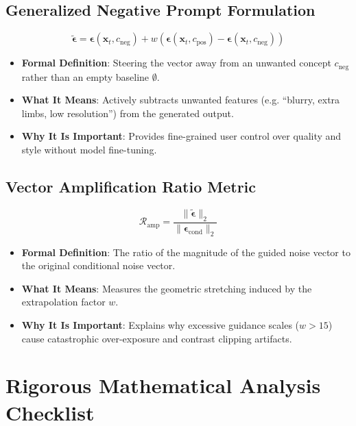 \documentclass[11pt,a4paper]{article}
\theoremstyle{definition}
\begin{document}
\subsection{Generalized Negative Prompt Formulation}
{\boldmath
\begin{equation}
\tilde{\boldsymbol{\epsilon}} = \boldsymbol{\epsilon}(\mathbf{x}_t, c_{\text{neg}}) + w \left( \boldsymbol{\epsilon}(\mathbf{x}_t, c_{\text{pos}}) - \boldsymbol{\epsilon}(\mathbf{x}_t, c_{\text{neg}}) \right)
\end{equation}
}
\begin{itemize}
    \item \textbf{Formal Definition}: Steering the vector away from an unwanted concept $c_{\text{neg}}$ rather than an empty baseline $\emptyset$.
    \item \textbf{What It Means}: Actively subtracts unwanted features (e.g. ``blurry, extra limbs, low resolution'') from the generated output.
    \item \textbf{Why It Is Important}: Provides fine-grained user control over quality and style without model fine-tuning.
\end{itemize}

\subsection{Vector Amplification Ratio Metric}
{\boldmath
\begin{equation}
\mathcal{R}_{\text{amp}} = \frac{\|\tilde{\boldsymbol{\epsilon}}\|_2}{\|\boldsymbol{\epsilon}_{\text{cond}}\|_2}
\end{equation}
}
\begin{itemize}
    \item \textbf{Formal Definition}: The ratio of the magnitude of the guided noise vector to the original conditional noise vector.
    \item \textbf{What It Means}: Measures the geometric stretching induced by the extrapolation factor $w$.
    \item \textbf{Why It Is Important}: Explains why excessive guidance scales ($w > 15$) cause catastrophic over-exposure and contrast clipping artifacts.
\end{itemize}

\section{Rigorous Mathematical Analysis Checklist}
\end{document}
